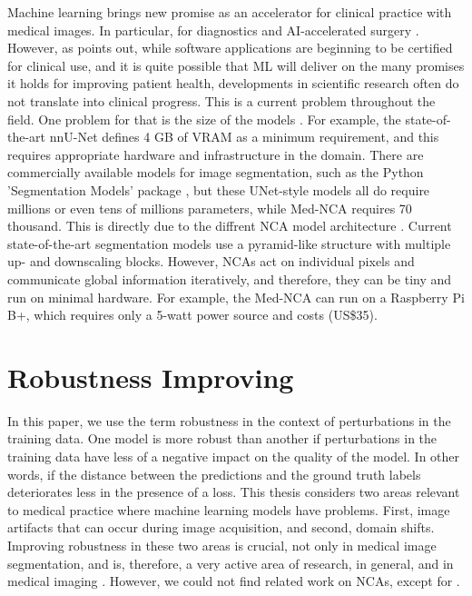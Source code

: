 Machine learning brings new promise as an accelerator for clinical practice with medical images. In particular, for diagnostics and AI-accelerated surgery \cite{Litjens:2017:DeepLMedImages_Survey, Varaquaux:2022:medMLFailuresFuture}. However, as \cite{Varaquaux:2022:medMLFailuresFuture} points out, while software applications are beginning to be certified for clinical use, and it is quite possible that ML will deliver on the many promises it holds for improving patient health, developments in scientific research often do not translate into clinical progress. This is a current problem throughout the field. One problem for that is the size of the models \cite{kalkhof:2023:medNCA}. For example, the state-of-the-art nnU-Net \cite{Isensee:2021:nnU-Net} defines 4 GB of VRAM as a minimum requirement, and this requires appropriate hardware and infrastructure in the domain. There are commercially available models for image segmentation, such as the Python 'Segmentation Models' package \cite{Iakubovskii:2019:PythonSegmentationModels}, but these UNet-style models all do require millions or even tens of millions parameters, while Med-NCA requires 70 thousand. This is directly due to the diffrent NCA model architecture \cite{kalkhof:2023:medNCA}. Current state-of-the-art segmentation models use a pyramid-like structure with multiple up- and downscaling blocks. However, NCAs act on individual pixels and communicate global information iteratively, and therefore, they can be tiny and run on minimal hardware. For example, the Med-NCA can run on a Raspberry Pi B+, which requires only a 5-watt power source and costs (US\$35). \cite{kalkhof:2023:medNCA}


\section{Robustness Improving}
\label{relatedWork:robustImproving}
In this paper, we use the term robustness in the context of perturbations in the training data. One model is more robust than another if perturbations in the training data have less of a negative impact on the quality of the model. In other words, if the distance between the predictions and the ground truth labels deteriorates less in the presence of a loss. This thesis considers two areas relevant to medical practice where machine learning models have problems. First, image artifacts that can occur during image acquisition, and second, domain shifts. Improving robustness in these two areas is crucial, not only in medical image segmentation, and is, therefore, a very active area of research, in general, \cite{Zhou:2023:DomainGeneralization_alsoAugmentation} and in medical imaging \cite{Yan:2019:DomainShiftsInMedSeg, Zhou:2023:DomainGeneralization_alsoAugmentation}. However, we could not find related work on NCAs, except for \cite{kalkhof:2023:medNCA, kalkhof:2023:M3D-NCA}.


